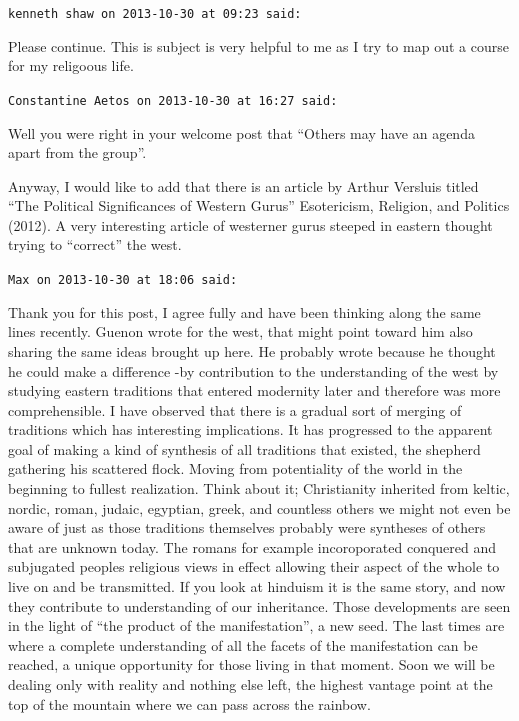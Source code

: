 \begin{footnotesize}
\begin{sffamily}
\texttt{kenneth shaw on 2013-10-30 at 09:23 said:}

Please continue. This is subject is very helpful to me as I try to map out a course for my religoous life.

\hfill

\texttt{Constantine Aetos on 2013-10-30 at 16:27 said:}

Well you were right in your welcome post that ``Others may have an agenda apart from the group''.

Anyway, I would like to add that there is an article by Arthur Versluis titled ``The Political Significances of Western Gurus'' Esotericism, Religion, and Politics (2012). A very interesting article of westerner gurus steeped in eastern thought trying to ``correct'' the west.

\hfill

\texttt{Max on 2013-10-30 at 18:06 said:}

Thank you for this post, I agree fully and have been thinking along the same lines recently. Guenon wrote for the west, that might point toward him also sharing the same ideas brought up here. He probably wrote because he thought he could make a difference -by contribution to the understanding of the west by studying eastern traditions that entered modernity later and therefore was more comprehensible. I have observed that there is a gradual sort of merging of traditions which has interesting implications. It has progressed to the apparent goal of making a kind of synthesis of all traditions that existed, the shepherd gathering his scattered flock. Moving from potentiality of the world in the beginning to fullest realization. Think about it; Christianity inherited from keltic, nordic, roman, judaic, egyptian, greek, and countless others we might not even be aware of just as those traditions themselves probably were syntheses of others that are unknown today. The romans for example incoroporated conquered and subjugated peoples religious views in effect allowing their aspect of the whole to live on and be transmitted. If you look at hinduism it is the same story, and now they contribute to understanding of our inheritance. Those developments are seen in the light of ``the product of the manifestation'', a new seed. The last times are where a complete understanding of all the facets of the manifestation can be reached, a unique opportunity for those living in that moment. Soon we will be dealing only with reality and nothing else left, the highest vantage point at the top of the mountain where we can pass across the rainbow.


\end{sffamily}
\end{footnotesize}
